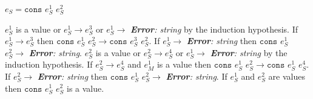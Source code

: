 \begin{case}

$e_{S}=\mathtt{cons}$ $e_{S}^{1}$ $e_{S}^{2}$

$e_{S}^{1}$ is a value or $e_{S}^{1}\rightarrow e_{S}^{3}$ or $e_{S}^{1}\rightarrow$ \emph{\textbf{Error}: string} by the induction hypothesis.  If $e_{S}^{1}\rightarrow e_{S}^{3}$ then $\mathtt{cons}$ $e_{S}^{1}$ $e_{S}^{2}\rightarrow\mathtt{cons}$ $e_{S}^{3}$ $e_{S}^{2}$.  If $e_{S}^{1}\rightarrow$ \emph{\textbf{Error}: string} then $\mathtt{cons}$ $e_{S}^{1}$ $e_{S}^{2}\rightarrow$ \emph{\textbf{Error}: string}.  $e_{S}^{2}$ is a value or $e_{S}^{2}\rightarrow e_{S}^{4}$ or $e_{S}^{1}\rightarrow$ \emph{\textbf{Error}: string} by the induction hypothesis.  If $e_{S}^{2}\rightarrow e_{S}^{4}$ and $e_{M}^{1}$ is a value then $\mathtt{cons}$ $e_{S}^{1}$ $e_{S}^{2}\rightarrow\mathtt{cons}$ $e_{S}^{1}$ $e_{S}^{4}$.  If $e_{S}^{2}\rightarrow$ \emph{\textbf{Error}: string} then $\mathtt{cons}$ $e_{S}^{1}$ $e_{S}^{2}\rightarrow$ \emph{\textbf{Error}: string}.  If $e_{S}^{1}$ and $e_{S}^{2}$ are values then $\mathtt{cons}$ $e_{S}^{1}$ $e_{S}^{2}$ is a value.

\end{case}